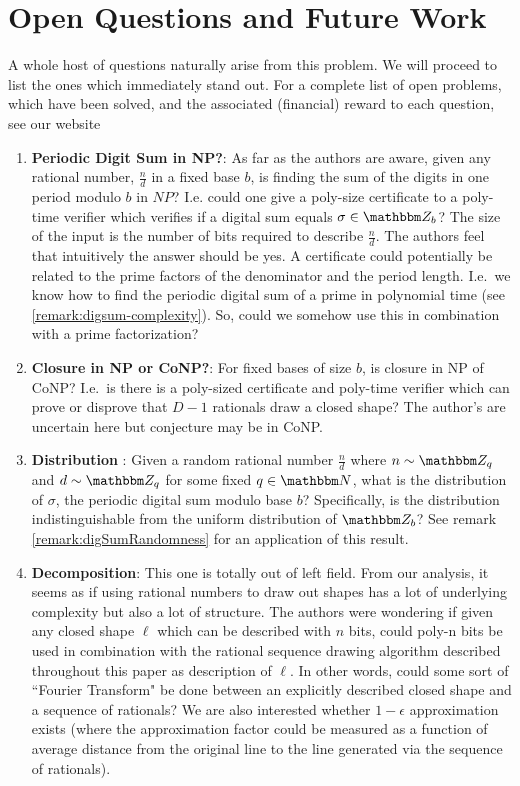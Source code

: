 \documentclass[11pt,titlepage]{article}
\begin{document}
\section{Open Questions and Future Work}
A whole host of questions naturally arise from this problem. We will proceed to list
the ones which immediately stand out. For a complete list of open problems, which have
been solved, and the associated (financial) reward to each question, see our website
\begin{enumerate}
  \item \textbf{Periodic Digit Sum in NP?}: As far as the authors are aware, given 
  any rational number, $\frac{n}{d}$ in a fixed base $b$, is finding the sum of the digits in
  one period modulo $b$ in $NP$? I.e. could one give a poly-size
  certificate to a poly-time verifier which verifies if a digital sum equals $\sigma \in \Z_b$?
  The size of the input is the number of bits required to describe $\frac{n}{d}$. The authors 
  feel that intuitively the answer should be yes. A certificate could potentially be related
  to the prime factors of the denominator and the period length. I.e.\ we know how to find
  the periodic digital sum of a prime in polynomial time (see \ref{remark:digsum-complexity}). So,
  could we somehow use this in combination with a prime factorization?

  \item \textbf{Closure in NP or CoNP?}: For fixed bases of size $b$, is closure in NP of CoNP?
  I.e.\ is there is a poly-sized certificate and poly-time verifier which can prove or disprove
  that $D-1$ rationals draw a closed shape? The author's are uncertain here but conjecture
  may be in CoNP.

  \item \textbf{Distribution }: Given a random rational number $\frac{n}{d}$
  where $n \sim \Z_q$ and $d \sim \Z_q$ for some fixed $q \in \N$, what is the distribution
  of $\sigma$, the periodic digital sum modulo base $b$? Specifically, is the distribution
  indistinguishable \cite{barak_2097} from the uniform distribution of $\Z_b$? 
  See remark \ref{remark:digSumRandomness} for an application of this result.

  \item \textbf{Decomposition}: This one is totally out of left field. From our analysis,
  it seems as if using rational numbers to draw out shapes has a lot of underlying complexity
  but also a lot of structure. The authors were wondering if given any closed shape $\ell$ which
  can be described with $n$ bits, could poly-n bits be used in combination with the rational
  sequence drawing algorithm described throughout this paper as description of $\ell$.
  In other words, could some sort of ``Fourier Transform" be done between an explicitly described
  closed shape and a sequence of rationals? We are also interested whether $1 - \epsilon$
  approximation exists 
  (where the approximation factor could be measured as a function of
  average distance from the original line to the line generated via the sequence of rationals).


\end{enumerate}
\end{document}
